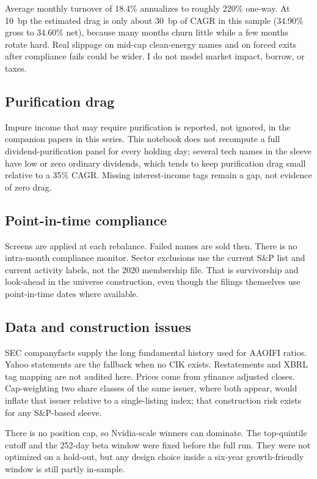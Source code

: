\documentclass[11pt,letterpaper]{article}
\begin{document}
Average monthly turnover of 18.4\% annualizes to roughly 220\% one-way. At 10~bp the estimated drag is only about 30~bp of CAGR in this sample (34.90\% gross to 34.60\% net), because many months churn little while a few months rotate hard. Real slippage on mid-cap clean-energy names and on forced exits after compliance fails could be wider. I do not model market impact, borrow, or taxes.

\subsection{Purification drag}

Impure income that may require purification is reported, not ignored, in the companion papers in this series. This notebook does not recompute a full dividend-purification panel for every holding day; several tech names in the sleeve have low or zero ordinary dividends, which tends to keep purification drag small relative to a 35\% CAGR. Missing interest-income tags remain a gap, not evidence of zero drag.

\subsection{Point-in-time compliance}

Screens are applied at each rebalance. Failed names are sold then. There is no intra-month compliance monitor. Sector exclusions use the current S\&P list and current activity labels, not the 2020 membership file. That is survivorship and look-ahead in the universe construction, even though the filings themselves use point-in-time dates where available.

\subsection{Data and construction issues}

SEC companyfacts supply the long fundamental history used for AAOIFI ratios. Yahoo statements are the fallback when no CIK exists. Restatements and XBRL tag mapping are not audited here. Prices come from yfinance adjusted closes. Cap-weighting two share classes of the same issuer, where both appear, would inflate that issuer relative to a single-listing index; that construction risk exists for any S\&P-based sleeve.

There is no position cap, so Nvidia-scale winners can dominate. The top-quintile cutoff and the 252-day beta window were fixed before the full run. They were not optimized on a hold-out, but any design choice inside a six-year growth-friendly window is still partly in-sample.
\end{document}
